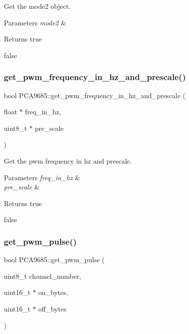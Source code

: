 Get the mode2 object. 


\begin{DoxyParams}{Parameters}
{\em mode2} & \\
\hline
\end{DoxyParams}
\begin{DoxyReturn}{Returns}
true 

false 
\end{DoxyReturn}
\mbox{\label{class_p_c_a9685_a2c205b32f73daced4b33c5cf7c5421ce}} 
\subsubsection{\texorpdfstring{get\+\_\+pwm\+\_\+frequency\+\_\+in\+\_\+hz\+\_\+and\+\_\+prescale()}{get\_pwm\_frequency\_in\_hz\_and\_prescale()}}
{\footnotesize\ttfamily bool P\+C\+A9685\+::get\+\_\+pwm\+\_\+frequency\+\_\+in\+\_\+hz\+\_\+and\+\_\+prescale (\begin{DoxyParamCaption}\item[{float $\ast$}]{freq\+\_\+in\+\_\+hz,  }\item[{uint8\+\_\+t $\ast$}]{pre\+\_\+scale }\end{DoxyParamCaption})}



Get the pwm frequency in hz and prescale. 


\begin{DoxyParams}{Parameters}
{\em freq\+\_\+in\+\_\+hz} & \\
\hline
{\em pre\+\_\+scale} & \\
\hline
\end{DoxyParams}
\begin{DoxyReturn}{Returns}
true 

false 
\end{DoxyReturn}
\mbox{\label{class_p_c_a9685_a3e30f34a9931802aad9821baf28b323f}} 
\subsubsection{\texorpdfstring{get\+\_\+pwm\+\_\+pulse()}{get\_pwm\_pulse()}}
{\footnotesize\ttfamily bool P\+C\+A9685\+::get\+\_\+pwm\+\_\+pulse (\begin{DoxyParamCaption}\item[{uint8\+\_\+t}]{channel\+\_\+number,  }\item[{uint16\+\_\+t $\ast$}]{on\+\_\+bytes,  }\item[{uint16\+\_\+t $\ast$}]{off\+\_\+bytes }\end{DoxyParamCaption})}



